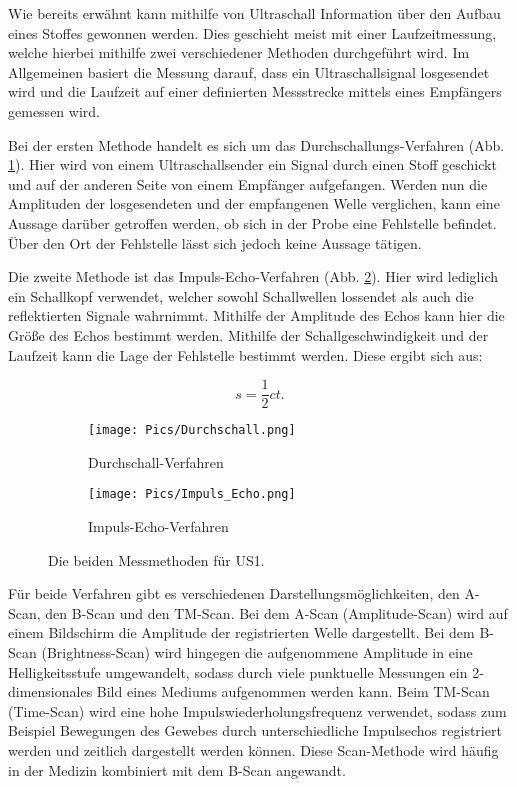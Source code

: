 Wie bereits erwähnt kann mithilfe von Ultraschall Information über
den Aufbau eines Stoffes gewonnen werden. Dies geschieht meist mit einer
Laufzeitmessung, welche hierbei mithilfe zwei verschiedener Methoden durchgeführt
wird. Im Allgemeinen basiert die Messung darauf, dass ein Ultraschallsignal
losgesendet wird und die Laufzeit auf einer definierten Messstrecke mittels eines
Empfängers gemessen wird.

Bei der ersten Methode handelt es sich um das Durchschallungs-Verfahren
(Abb. \ref{fig:Durchschall}). Hier
wird von einem Ultraschallsender ein Signal durch einen Stoff geschickt und auf
der anderen Seite von einem Empfänger aufgefangen. Werden nun die Amplituden der
losgesendeten und der empfangenen Welle verglichen, kann eine Aussage darüber
getroffen werden, ob sich in der Probe eine Fehlstelle befindet. Über den Ort der
Fehlstelle lässt sich jedoch keine Aussage tätigen.

Die zweite Methode ist das Impuls-Echo-Verfahren (Abb. \ref{fig:Impuls_Echo}).
Hier wird lediglich ein Schallkopf
verwendet, welcher sowohl Schallwellen lossendet als auch die reflektierten Signale
wahrnimmt. Mithilfe der Amplitude des Echos kann hier die Größe des Echos bestimmt
werden. Mithilfe der Schallgeschwindigkeit und der Laufzeit kann
die Lage der Fehlstelle bestimmt werden. Diese ergibt sich aus:

\begin{equation}
  s = \frac{1}{2} c t.
  \label{eqn:Fehlstelle}
\end{equation}

\begin{figure}
  \centering
  \begin{subfigure}{0.48\textwidth}
      \centering
      \texttt{[image: Pics/Durchschall.png]}
      \caption{Durchschall-Verfahren}
      \label{fig:Durchschall}
  \end{subfigure}
  \begin{subfigure}{0.48\textwidth}
    \centering
      \texttt{[image: Pics/Impuls\_Echo.png]}
      \caption{Impuls-Echo-Verfahren}
      \label{fig:Impuls_Echo}
    \end{subfigure}
\caption{Die beiden Messmethoden für US1. \cite{anleitung01}}
\label{fig:Messmethoden}
\end{figure}

Für beide Verfahren gibt es verschiedenen Darstellungsmöglichkeiten, den A-Scan,
den B-Scan und den TM-Scan. Bei dem A-Scan (Amplitude-Scan) wird auf einem
Bildschirm die Amplitude der registrierten Welle dargestellt. Bei dem B-Scan
(Brightness-Scan) wird hingegen die aufgenommene Amplitude in eine Helligkeitsstufe
umgewandelt, sodass durch viele punktuelle Messungen ein 2-dimensionales Bild
eines Mediums aufgenommen werden kann. Beim TM-Scan (Time-Scan) wird eine hohe
Impulswiederholungsfrequenz verwendet, sodass zum Beispiel Bewegungen des Gewebes
durch unterschiedliche Impulsechos registriert werden und zeitlich dargestellt
werden können. Diese Scan-Methode wird häufig in der Medizin kombiniert mit dem
B-Scan angewandt.

